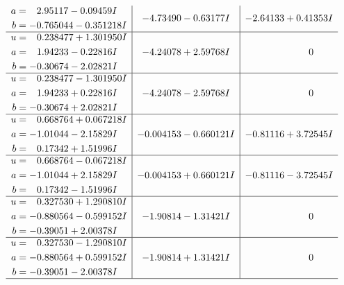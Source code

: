 \documentclass[1p]{elsarticle_modified}
\theoremstyle{definition}
\begin{document}
$$\begin{array}{c|c|c}
\begin{aligned}
a &= \phantom{-}2.95117 - 0.09459 I \\
b &= -0.765044 - 0.351218 I\end{aligned}
 & -4.73490 - 0.63177 I & -2.64133 + 0.41353 I \\ \hline\begin{aligned}
u &= \phantom{-}0.238477 + 1.301950 I \\
a &= \phantom{-}1.94233 - 0.22816 I \\
b &= -0.30674 - 2.02821 I\end{aligned}
 & -4.24078 + 2.59768 I & \phantom{-0.000000 } 0 \\ \hline\begin{aligned}
u &= \phantom{-}0.238477 - 1.301950 I \\
a &= \phantom{-}1.94233 + 0.22816 I \\
b &= -0.30674 + 2.02821 I\end{aligned}
 & -4.24078 - 2.59768 I & \phantom{-0.000000 } 0 \\ \hline\begin{aligned}
u &= \phantom{-}0.668764 + 0.067218 I \\
a &= -1.01044 - 2.15829 I \\
b &= \phantom{-}0.17342 + 1.51996 I\end{aligned}
 & -0.004153 - 0.660121 I & -0.81116 + 3.72545 I \\ \hline\begin{aligned}
u &= \phantom{-}0.668764 - 0.067218 I \\
a &= -1.01044 + 2.15829 I \\
b &= \phantom{-}0.17342 - 1.51996 I\end{aligned}
 & -0.004153 + 0.660121 I & -0.81116 - 3.72545 I \\ \hline\begin{aligned}
u &= \phantom{-}0.327530 + 1.290810 I \\
a &= -0.880564 - 0.599152 I \\
b &= -0.39051 + 2.00378 I\end{aligned}
 & -1.90814 - 1.31421 I & \phantom{-0.000000 } 0 \\ \hline\begin{aligned}
u &= \phantom{-}0.327530 - 1.290810 I \\
a &= -0.880564 + 0.599152 I \\
b &= -0.39051 - 2.00378 I\end{aligned}
 & -1.90814 + 1.31421 I & \phantom{-0.000000 } 0\\
 \hline 

\end{array}$$
\end{document}
